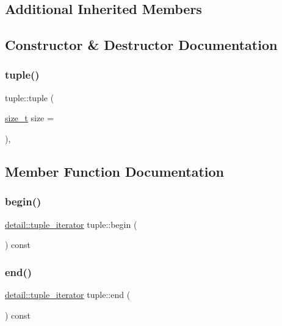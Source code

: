 \subsection*{Additional Inherited Members}


\subsection{Constructor \& Destructor Documentation}
\mbox{\label{classtuple_a627c178ecad64dd6795906d91c844ed8}} 
\subsubsection{\texorpdfstring{tuple()}{tuple()}}
{\footnotesize\ttfamily tuple\+::tuple (\begin{DoxyParamCaption}\item[{\mbox{\hyperlink{detail_2common_8h_a801d6a451a01953ef8cbae6feb6a3638}{size\+\_\+t}}}]{size = {} }\end{DoxyParamCaption})\hspace{0.3cm}{\ttfamily [inline]}, {\ttfamily [explicit]}}



\subsection{Member Function Documentation}
\mbox{\label{classtuple_a4f9fdd4818d98a30ebd5001c69409902}} 
\subsubsection{\texorpdfstring{begin()}{begin()}}
{\footnotesize\ttfamily \mbox{\hyperlink{pytypes_8h_ab687138c20cfdae7f2935d4fe93cb83a}{detail\+::tuple\+\_\+iterator}} tuple\+::begin (\begin{DoxyParamCaption}{ }\end{DoxyParamCaption}) const\hspace{0.3cm}{\ttfamily [inline]}}

\mbox{\label{classtuple_ae02904f7b808223cb2922e9c6f7a67b3}} 
\subsubsection{\texorpdfstring{end()}{end()}}
{\footnotesize\ttfamily \mbox{\hyperlink{pytypes_8h_ab687138c20cfdae7f2935d4fe93cb83a}{detail\+::tuple\+\_\+iterator}} tuple\+::end (\begin{DoxyParamCaption}{ }\end{DoxyParamCaption}) const\hspace{0.3cm}{\ttfamily [inline]}}

